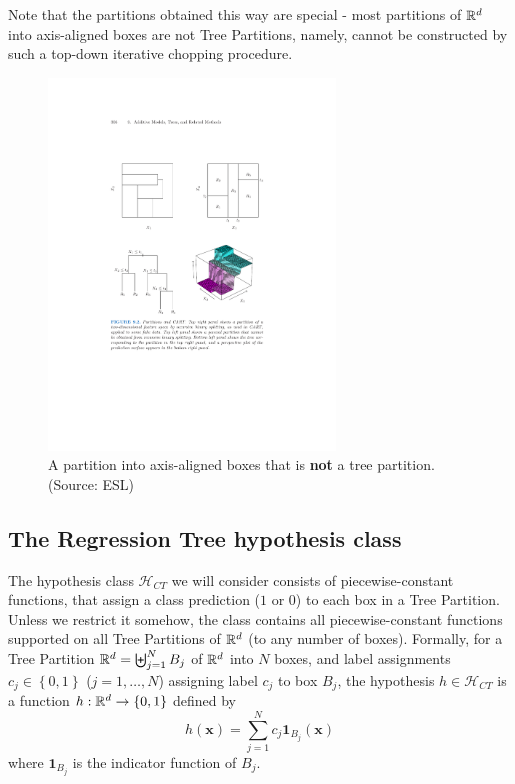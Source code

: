 \documentclass[11pt]{article}
\newcommand{\Hc}{\mathcal{H}}
\newcommand{\VV}[1]{\mathbf{#1}}
\begin{document}
\begin{itemize}
     Note that the partitions obtained
     this way are special - most partitions of $\mathbb{R}^d$ into axis-aligned
     boxes are not Tree Partitions, namely, cannot be constructed by such a
     top-down iterative chopping procedure. 

      \begin{figure}[h!]
       \centering
       \includegraphics[width=3in]{esl_no_tree.pdf}
       \caption{A partition into axis-aligned boxes that is {\bf not} a tree
       partition. (Source: ESL)}
    
     \end{figure}

    
     \subsection{The Regression Tree hypothesis class}

     The hypothesis class $\Hc_{CT}$ we will consider consists of piecewise-constant
     functions, that assign a class prediction ($1$ or $0$) to each box in a
     Tree Partition. Unless we restrict it somehow, the class contains all
     piecewise-constant functions supported on all Tree Partitions of $\mathbb{R}^d$
     (to any number of boxes).
     Formally, for a Tree Partition $\mathbb{R}^d=\biguplus_{j=1}^N B_j$ of
     $\mathbb{R}^d$ into $N$ boxes, and label assignments $c_j \in \left\{ 0,1
     \right\}$ ($j=1,\ldots, N$) assigning label $c_j$ to box $B_j$, the
     hypothesis $h\in\Hc_{CT}$ is a function $h:\mathbb{R}^d\to\left\{ 0,1
     \right\}$ defined by 
     \[
       h(\VV{x}) = \sum_{j=1}^N c_j \mathbf{1}_{B_j}(\VV{x})
     \]
     where $\mathbf{1}_{B_j}$ is the indicator function of $B_j$. 


\end{itemize}
\end{document}
